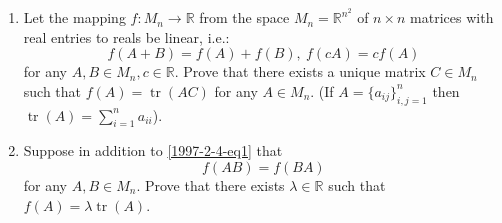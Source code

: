 \documentclass{article}
\DeclareMathOperator{\Tr}{tr}
\begin{document}
\setlength{\parindent}{0pt}
\begin{enumerate}[label=\alph*)]
\item Let the mapping $f:M_n\to \mathbb{R}$ from the space $M_n=\mathbb{R}^{n^2}$ of $n\times n $ matrices with real entries to reals be linear, i.e.:
\begin{equation}\label{1997-2-4-eq1}
f(A+B)=f(A)+f(B),\ f(c A)=c f(A)
\end{equation}
for any $A,B\in M_n, c\in \mathbb{R}$. Prove that there exists a unique matrix $C\in M_n$ such that $f(A)=\Tr (AC)$ for any $A\in M_n$. (If $A=\{a_{ij}\}_{i,j=1}^n$ then $\Tr(A)=\sum_{i=1}^n a_{ii}$).
\item Suppose in addition to \eqref{1997-2-4-eq1} that  
\begin{equation}\label{1997-2-4-eq2}
f(AB)=f(BA)
\end{equation}
for any $A,B\in M_n$. Prove that there exists $\lambda \in \mathbb{R}$ such that $f(A)=\lambda\Tr(A)$.
\end{enumerate}
\end{document}
